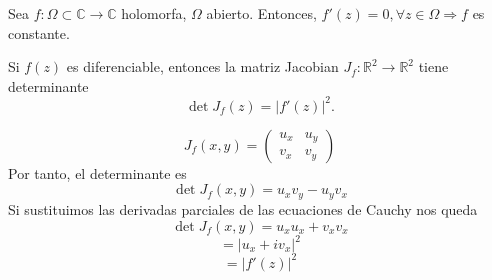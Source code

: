 \begin{cor}
  Sea $f: \Omega \subset \mathbb{C} \to \mathbb{C}$ holomorfa, $\Omega$ abierto. Entonces, $f'(z) = 0, \forall z \in \Omega \Rightarrow f$ es constante.
\end{cor}

\begin{theo}
  Si $f(z)$ es diferenciable, entonces la matriz Jacobian $J_{f}: \mathbb{R}^{2} \to \mathbb{R}^{2}$ tiene determinante
  \[ 
    \det J_{f}(z) = | f'(z) |^{2} .
  \] 
\end{theo}

\begin{dem}
  \[ 
    J_{f}(x,y) =
    \begin{pmatrix}
       u_{x} & u_{y} \\
       v_{x} & v_{y}
    \end{pmatrix} 
  \] 
  Por tanto, el determinante es
  \[ 
    \det J_{f}(x,y) = u_{x} v_{y} - u_{y} v_{x} 
  \] 
  Si sustituimos las derivadas parciales de las ecuaciones de Cauchy nos queda
  \[ 
    \det J_{f}(x,y) = u_{x} u_{x} + v_{x} v_{x} 
  \] 
  \[ 
    = | u_{x} + i v_{x} |^{2} 
  \] 
  \[ 
    = | f'(z) |^{2} 
  \] 

\end{dem}
